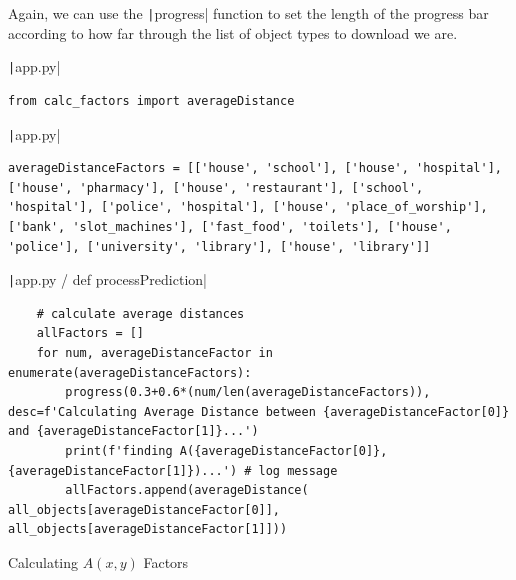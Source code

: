 \documentclass[12pt]{report}
\newcommand{\pil}[1]{\protect\texttt|#1|}
\begin{document}
Again, we can use the \pil{progress} function to set the length of the progress bar according to how far through the list of object types to download we are.

\begin{center}
\end{center}

\begin{listing}[H]
\pil{app.py}
\begin{verbatim}
from calc_factors import averageDistance
\end{verbatim}
\pil{app.py}
\begin{verbatim}
averageDistanceFactors = [['house', 'school'], ['house', 'hospital'], ['house', 'pharmacy'], ['house', 'restaurant'], ['school', 'hospital'], ['police', 'hospital'], ['house', 'place_of_worship'], ['bank', 'slot_machines'], ['fast_food', 'toilets'], ['house', 'police'], ['university', 'library'], ['house', 'library']]
\end{verbatim}
\pil{app.py / def processPrediction}
\begin{verbatim}
    # calculate average distances
    allFactors = []
    for num, averageDistanceFactor in enumerate(averageDistanceFactors):
        progress(0.3+0.6*(num/len(averageDistanceFactors)), desc=f'Calculating Average Distance between {averageDistanceFactor[0]} and {averageDistanceFactor[1]}...')
        print(f'finding A({averageDistanceFactor[0]}, {averageDistanceFactor[1]})...') # log message
        allFactors.append(averageDistance( all_objects[averageDistanceFactor[0]], all_objects[averageDistanceFactor[1]]))
\end{verbatim}
\caption{Calculating $A\left(x,y\right)$ Factors}\label{cs:predictionAverageDistance}
\end{listing}
\end{document}
